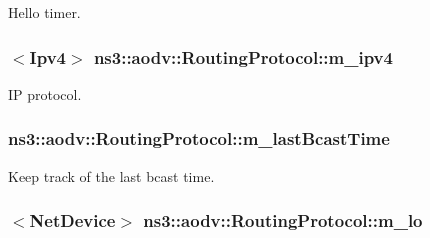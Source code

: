 Hello timer. 

\subsubsection[{\texorpdfstring{m\+\_\+ipv4}{m_ipv4}}]{$<${\bf Ipv4}$>$ ns3\+::aodv\+::\+Routing\+Protocol\+::m\+\_\+ipv4\hspace{0.3cm}{\ttfamily [private]}}\hypertarget{classns3_1_1aodv_1_1RoutingProtocol_aee33006b1f9d8b24d4722037ff3fec98}{}\label{classns3_1_1aodv_1_1RoutingProtocol_aee33006b1f9d8b24d4722037ff3fec98}


IP protocol. 

\subsubsection[{\texorpdfstring{m\+\_\+last\+Bcast\+Time}{m_lastBcastTime}}]{ ns3\+::aodv\+::\+Routing\+Protocol\+::m\+\_\+last\+Bcast\+Time\hspace{0.3cm}{\ttfamily [private]}}\hypertarget{classns3_1_1aodv_1_1RoutingProtocol_a0edfc4673f09d0145efba15a1476bc15}{}\label{classns3_1_1aodv_1_1RoutingProtocol_a0edfc4673f09d0145efba15a1476bc15}


Keep track of the last bcast time. 

\subsubsection[{\texorpdfstring{m\+\_\+lo}{m_lo}}]{$<${\bf Net\+Device}$>$ ns3\+::aodv\+::\+Routing\+Protocol\+::m\+\_\+lo\hspace{0.3cm}{\ttfamily [private]}}\hypertarget{classns3_1_1aodv_1_1RoutingProtocol_a55d7e550c45e7a211ba8781f1b5b0015}{}\label{classns3_1_1aodv_1_1RoutingProtocol_a55d7e550c45e7a211ba8781f1b5b0015}


